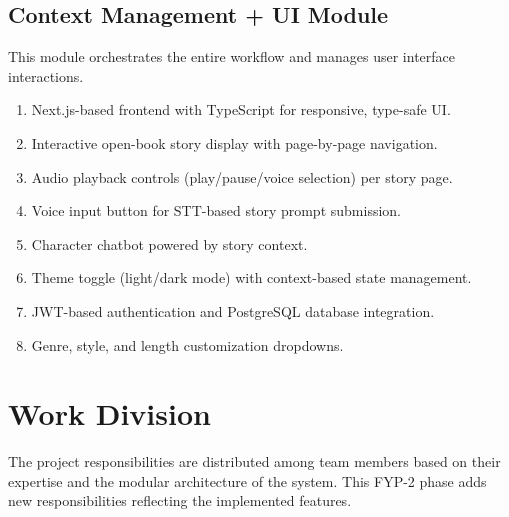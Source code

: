 \subsection{Context Management + UI Module}
This module orchestrates the entire workflow and manages user interface interactions.
\begin{enumerate}
    \item Next.js-based frontend with TypeScript for responsive, type-safe UI.
    \item Interactive open-book story display with page-by-page navigation.
    \item Audio playback controls (play/pause/voice selection) per story page.
    \item Voice input button for STT-based story prompt submission.
    \item Character chatbot powered by story context.
    \item Theme toggle (light/dark mode) with context-based state management.
    \item JWT-based authentication and PostgreSQL database integration.
    \item Genre, style, and length customization dropdowns.
\end{enumerate}


\section{Work Division}

The project responsibilities are distributed among team members based on their expertise and the modular architecture of the system. This FYP-2 phase adds new responsibilities reflecting the implemented features.

\clearpage

